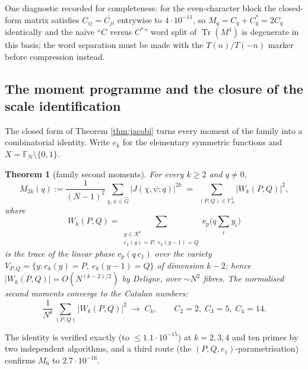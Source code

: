 \documentclass[11pt,reqno]{amsart}
\newtheorem{theorem}{Theorem}[section]
\theoremstyle{definition}
\newcommand{\FF}{\mathbb{F}}
\newcommand{\ep}{\mathrm{e}_p}
\begin{document}
One diagnostic recorded for completeness: for the even-character block the
closed-form matrix satisfies $C_{ij}=\overline{C_{ji}}$ entrywise to
$4\cdot10^{-11}$, so $M_q=C_q+C_q^{*}=2C_q$ identically and the naive
``$C$ versus $C^{*}$'' word split of $\operatorname{Tr}(M^4)$ is degenerate in
this basis; the word separation must be made with the $T(n)/T(-n)$ marker before
compression instead.


\subsection{The moment programme and the closure of the
scale identification}\label{sub:r82e}

The closed form of Theorem \ref{thm:jacobi} turns every moment of the family
into a combinatorial identity.  Write $e_k$ for the elementary symmetric
functions and $X=\FF_N\setminus\{0,1\}$.

\begin{theorem}[family second moments]\label{thm:momentpattern}
For every $k\ge2$ and $q\neq0$,
\[
  M_{2k}(q):=\frac{1}{(N-1)^2}\sum_{\chi,\psi\in\widehat G}|J(\chi,\psi;q)|^{2k}
  \;=\;\sum_{(P,Q)\in\FF_N^2}|W_k(P,Q)|^2,
\]
where
\[
  W_k(P,Q)=\sum_{\substack{y\in X^k\\ e_k(y)=P,\; e_k(y-1)=Q}}\ep\!\bigl(q\textstyle\sum_i y_i\bigr)
\]
is the trace of the linear phase $\ep(q\,e_1)$ over the variety
$V_{P,Q}=\{y:e_k(y)=P,\ e_k(y-1)=Q\}$ of dimension $k-2$; hence
$|W_k(P,Q)|=O(N^{(k-2)/2})$ by Deligne, over $\sim N^2$ fibres.  The
normalised second moments converge to the Catalan numbers:
\[
  \frac{1}{N^k}\sum_{(P,Q)}|W_k(P,Q)|^2\;\longrightarrow\;C_k,
  \qquad C_2=2,\; C_3=5,\; C_4=14.
\]
\end{theorem}

The identity is verified exactly (to $\le1.1\cdot10^{-15}$) at $k=2,3,4$ and
ten primes by two independent algorithms, and a third route (the
$(P,Q,e_1)$-parametrisation) confirms $M_6$ to $2.7\cdot10^{-16}$.
\end{document}
